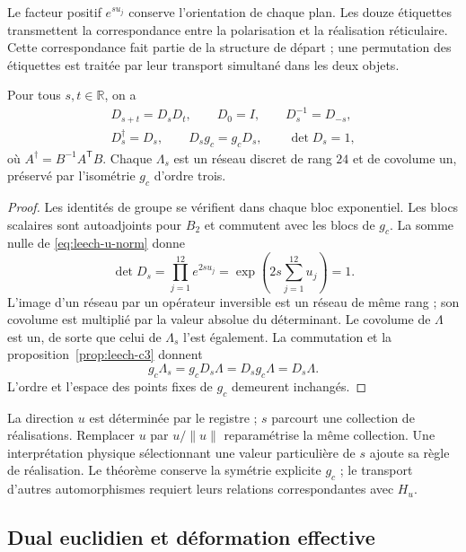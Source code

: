 Le facteur positif \(e^{su_j}\) conserve l'orientation de chaque plan. Les douze étiquettes transmettent la correspondance entre la polarisation et la réalisation réticulaire. Cette correspondance fait partie de la structure de départ ; une permutation des étiquettes est traitée par leur transport simultané dans les deux objets.

\begin{theorem}
\label{thm:leech-flow}
Pour tous \(s,t\in\mathbb R\), on a
\[
\begin{gathered}
 D_{s+t}=D_sD_t,\qquad D_0=I,\qquad D_s^{-1}=D_{-s},\\
 D_s^\dagger=D_s,\qquad D_sg_c=g_cD_s,\qquad \det D_s=1,
\end{gathered}
\]
où \(A^\dagger=B^{-1}A^{\mathsf T}B\).
Chaque \(\Lambda_s\) est un réseau discret de rang \(24\) et de covolume
un, préservé par l’isométrie \(g_c\) d’ordre trois.
\end{theorem}
\begin{proof}
Les identités de groupe se vérifient dans chaque bloc exponentiel.
Les blocs scalaires sont autoadjoints pour \(B_2\) et commutent
avec les blocs de \(g_c\). La somme nulle de
\eqref{eq:leech-u-norm} donne
\[
 \det D_s=\prod_{j=1}^{12}e^{2su_j}
 =\exp\left(2s\sum_{j=1}^{12}u_j\right)=1.
\]
L’image d’un réseau par un opérateur inversible est un réseau de
même rang ; son covolume est multiplié par la valeur absolue du
déterminant. Le covolume de \(\Lambda\) est un, de sorte que celui
de \(\Lambda_s\) l’est également. La commutation et
la proposition~\ref{prop:leech-c3} donnent
\[
 g_c\Lambda_s=g_cD_s\Lambda=D_sg_c\Lambda=D_s\Lambda.
\]
L'ordre et l'espace des points fixes de \(g_c\) demeurent inchangés.
\end{proof}

\begin{remark}
La direction \(u\) est déterminée par le registre ; \(s\) parcourt une collection de réalisations. Remplacer \(u\) par \(u/\|u\|\) reparamétrise la même collection. Une interprétation physique sélectionnant une valeur particulière de \(s\) ajoute sa règle de réalisation. Le théorème conserve la symétrie explicite \(g_c\) ; le transport d'autres automorphismes requiert leurs relations correspondantes avec \(H_u\).
\end{remark}

\subsection{Dual euclidien et déformation effective}
\label{subsec:leech-dual}

